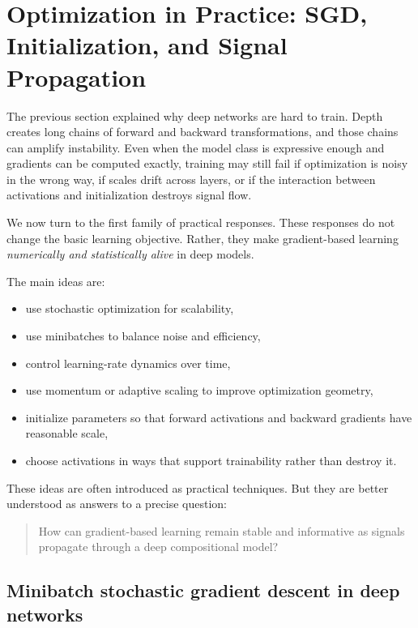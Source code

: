 \section{Optimization in Practice: SGD, Initialization, and Signal Propagation}
\thispagestyle{plain}

The previous section explained why deep networks are hard to train.
Depth creates long chains of forward and backward transformations, and those chains can amplify instability.
Even when the model class is expressive enough and gradients can be computed exactly, training may still fail if optimization is noisy in the wrong way, if scales drift across layers, or if the interaction between activations and initialization destroys signal flow.

\medskip

We now turn to the first family of practical responses.
These responses do not change the basic learning objective.
Rather, they make gradient-based learning \emph{numerically and statistically alive} in deep models.

\medskip

The main ideas are:
\begin{itemize}
    \item use stochastic optimization for scalability,
    \item use minibatches to balance noise and efficiency,
    \item control learning-rate dynamics over time,
    \item use momentum or adaptive scaling to improve optimization geometry,
    \item initialize parameters so that forward activations and backward gradients have reasonable scale,
    \item choose activations in ways that support trainability rather than destroy it.
\end{itemize}

\medskip

These ideas are often introduced as practical techniques.
But they are better understood as answers to a precise question:

\begin{quote}
How can gradient-based learning remain stable and informative as signals propagate through a deep compositional model?
\end{quote}

\subsection*{Minibatch stochastic gradient descent in deep networks}

